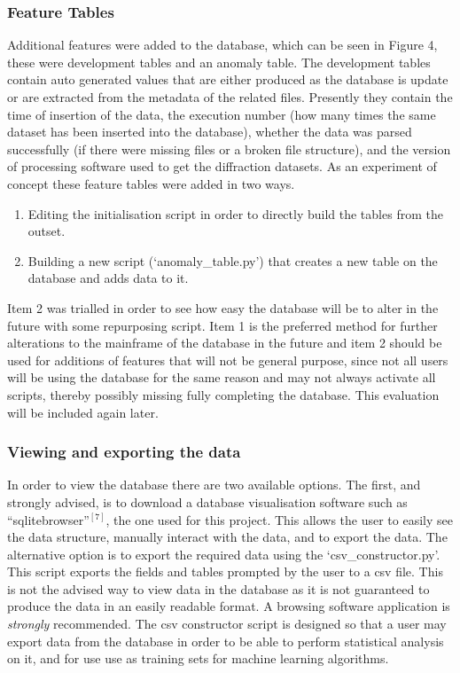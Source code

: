 \documentclass[11pt, a4paper]{article}
\begin{document}
\begin{multicols}{2}
\subsubsection{Feature Tables}
Additional features were added to the database, which can be seen in Figure 4, these were development tables and an anomaly table. The development tables contain auto generated values that are either produced as the database is update or are extracted from the metadata of the related files. Presently they contain the time of insertion of the data, the execution number (how many times the same dataset has been inserted into the database), whether the data was parsed successfully (if there were missing files or a broken file structure), and the version of processing software used to get the diffraction datasets. As an experiment of concept these feature tables were added in two ways.
\begin{enumerate}
\item Editing the initialisation script in order to directly build the tables from the outset.
\item Building a new script (`anomaly\_table.py') that creates a new table on the database and adds data to it.
\end{enumerate}
Item 2 was trialled in order to see how easy the database will be to alter in the future with some repurposing script. Item 1 is the preferred method for further alterations to the mainframe of the database in the future and item 2 should be used for additions of features that will not be general purpose, since not all users will be using the database for the same reason and may not always activate all scripts, thereby possibly missing fully completing the database. This evaluation will be included again later. 
\subsubsection{Viewing and exporting the data}
In order to view the database there are two available options. The first, and strongly advised, is to download a database visualisation software such as ``sqlitebrowser''$^{[7]}$, the one used for this project. This allows the user to easily see the data structure, manually interact with the data, and to export the data. The alternative option is to export the required data using the `csv\_constructor.py'. This script exports the fields and tables prompted by the user to a csv file. This is not the advised way to view data in the database as it is not guaranteed to produce the data in an easily readable format. A browsing software application is \textit{strongly} recommended. The csv constructor script is designed so that a user may export data from the database in order to be able to perform statistical analysis on it, and for use use as training sets for machine learning algorithms. 

\end{multicols}
\end{document}
